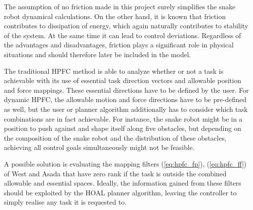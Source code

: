 The assumption of no friction made in this project surely simplifies the snake robot dynamical calculations. On the other hand, it is known that friction contributes to dissipation of energy, which again naturally contributes to stability of the system. At the same time it can lead to control deviations. Regardless of the advantages and disadvantages, friction plays a significant role in physical situations and should therefore later be included in the model. 


The traditional HPFC method is able to analyze whether or not a task is achievable with its use of essential task direction vectors and allowable position and force mappings. These essential directions have to be defined by the user. For dynamic HPFC, the allowable motion and force directions have to be pre-defined as well, but the user or planner algorithm additionally has to consider which task combinations are in fact achievable. For instance, the snake robot might be in a position to push against and shape itself along five obstacles, but depending on the composition of the snake robot and the distribution of these obstacles, achieving all control goals simultaneously might not be feasible. 

A possible solution is evaluating the mapping filters (\ref{eq:hpfc_fp}), (\ref{eq:hpfc_ff}) of West and Asada \cite{west1985method} that have zero rank if the task is outside the combined allowable and essential spaces. Ideally, the information gained from these filters should be exploited by the HOAL planner algorithm, leaving the controller to simply realise any task it is requested to.


